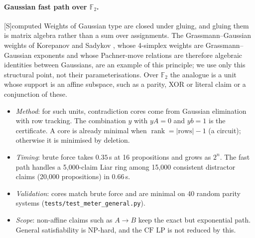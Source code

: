 \documentclass[11pt]{article}
\theoremstyle{definition}
\theoremstyle{remark}
\newcommand{\F}{\mathbb{F}}
\newcommand{\CF}{\mathrm{CF}}
\newcommand{\src}[1]{\textsf{\small[#1]}}
\newcommand{\st}[1]{\textsf{\small\color{gray}#1}}
\begin{document}
\paragraph{Gaussian fast path over $\F_2$.}\src{S}\st{computed}
Weights of Gaussian type are closed under gluing, and gluing them is matrix algebra rather than a sum over assignments. The Grassmann--Gaussian weights of Korepanov and Sadykov \cite{korepanov}, whose 4-simplex weights are Grassmann--Gaussian exponents and whose Pachner-move relations are therefore algebraic identities between Gaussians, are an example of this principle; we use only this structural point, not their parameterisations. Over $\F_2$ the analogue is a unit whose support is an affine subspace, such as a parity, XOR or literal claim or a conjunction of these.
\begin{itemize}
  \item \emph{Method}: for such units, contradiction cores come from Gaussian elimination with row tracking. The combination $y$ with $yA=0$ and $yb=1$ is the certificate. A core is already minimal when $\operatorname{rank}=|\text{rows}|-1$ (a circuit); otherwise it is minimised by deletion.
  \item \emph{Timing}: brute force takes $0.35$\,s at 16 propositions and grows as $2^n$. The fast path handles a 5{,}000-claim Liar ring among 15{,}000 consistent distractor claims (20{,}000 propositions) in $0.66$\,s.
  \item \emph{Validation}: cores match brute force and are minimal on 40 random parity systems (\texttt{tests/test\_meter\_general.py}).
  \item \emph{Scope}: non-affine claims such as $A\to B$ keep the exact but exponential path. General satisfiability is NP-hard, and the $\CF$ LP is not reduced by this.
\end{itemize}
\end{document}
